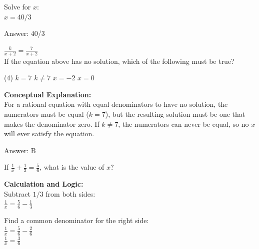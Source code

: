 \documentclass[11pt,paper=a4,answers]{exam}
\begin{document}
\begin{questions}
\begin{solution}
\vspace{15pt}

Solve for $x$: \\
$x = 40/3$

\vspace{30pt}

Answer: \colorbox{yellow!100}{40/3}
\end{solution}

\vspace{40pt}

\question
$\frac{k}{x+2} = \frac{7}{x+2}$ \\
If the equation above has no solution, which of the following must be true?
\begin{tasks}(4)
    \task $k = 7$
    \task $k \neq 7$
    \task $x = -2$
    \task $x = 0$
\end{tasks}

\begin{solution}
\textbf{Conceptual Explanation:} \\
For a rational equation with equal denominators to have no solution, the numerators must be equal ($k=7$), but the resulting solution must be one that makes the denominator zero. If $k \neq 7$, the numerators can never be equal, so no $x$ will ever satisfy the equation.

\vspace{30pt}

Answer: \colorbox{yellow!100}{B}
\end{solution}

\vspace{40pt}

\question
If $\frac{1}{x} + \frac{1}{3} = \frac{5}{6}$, what is the value of $x$?

\begin{solution}
\textbf{Calculation and Logic:} \\
Subtract $1/3$ from both sides: \\
$\frac{1}{x} = \frac{5}{6} - \frac{1}{3}$

\vspace{15pt}

Find a common denominator for the right side: \\
$\frac{1}{x} = \frac{5}{6} - \frac{2}{6}$ \\
$\frac{1}{x} = \frac{3}{6}$


\end{solution}
\end{questions}
\end{document}
